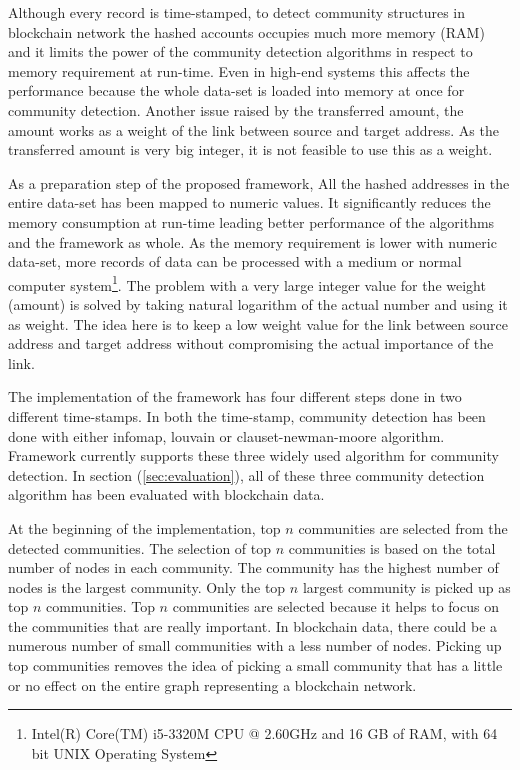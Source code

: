 Although every record is time-stamped, to detect community structures in blockchain network the hashed accounts occupies much more memory (RAM) and it limits the power of the community detection algorithms in respect to memory requirement at run-time. Even in high-end systems this affects the performance because the whole data-set is loaded into memory at once for community detection. Another issue raised by the transferred amount, the amount works as a weight of the link between source and target address. As the transferred amount is very big integer, it is not feasible to use this as a weight. 

As a preparation step of the proposed framework, All the hashed addresses in the entire data-set has been mapped to numeric values. It significantly reduces the memory consumption at run-time leading better performance of the algorithms and the framework as whole. As the memory requirement is lower with numeric data-set, more records of data can be processed with a medium or normal computer system\footnote{Intel(R) Core(TM) i5-3320M CPU @ 2.60GHz and 16 GB of RAM, with 64 bit UNIX Operating System}.  The problem with a very large integer value for the weight (amount) is solved by taking natural logarithm of the actual number and using it as weight. The idea here is to keep a low weight value for the link between source address and target address without compromising the actual importance of the link.

The implementation of the framework has four different steps done in two different time-stamps. In both the time-stamp, community detection has been done with either infomap, louvain or clauset-newman-moore algorithm. Framework currently supports these three widely used algorithm for community detection. In section (\ref{sec:evaluation}), all of these three community detection algorithm has been evaluated with blockchain data.

At the beginning of the implementation, top $n$ communities are selected from the detected communities. The selection of top $n$ communities is based on the total number of nodes in each community. The community has the highest number of nodes is the largest community. Only the top $n$ largest community is picked up as top $n$ communities. Top $n$ communities are selected because it helps to focus on the communities that are really important. In blockchain data, there could be a numerous number of small communities with a less number of nodes. Picking up top communities removes the idea of picking a small community that has a little or no effect on the entire graph representing a blockchain network.

